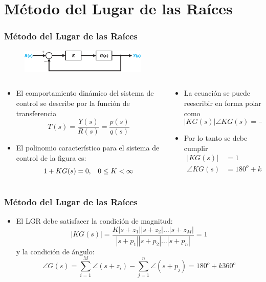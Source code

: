 \documentclass[aspectratio=169,handout]{beamer}
\theoremstyle{definition}
\theoremstyle{plain}
\theoremstyle{remark}
\begin{document}
\section{Método del Lugar de las Raíces}
\begin{frame}[<+->]\frametitle{Método del Lugar de las Raíces}
	\begin{figure}
		\includegraphics[width=6cm]{images/controlsystem.eps}
	\end{figure}
	\vspace*{-3mm}
	\begin{columns}
	\begin{column}{0.5\textwidth}
	\begin{itemize}
		\item El comportamiento dinámico del sistema de control se describe por la función de transferencia
		\begin{equation*}
			T(s) = \frac{Y(s)}{R(s)} = \frac{p(s)}{q(s)}
		\end{equation*}
		\item El polinomio característico para el sistema de control de la figura es:
		\begin{equation*}
			1 + K G(s) = 0,\hspace*{3mm} 0 \leq K < \infty
		\end{equation*}
	\end{itemize}
	\end{column}	
	\begin{column}{0.5\textwidth}
	\begin{itemize}
		\item La ecuación se puede reescribir en forma polar como
		\begin{equation*}
			|KG(s)| \angle KG(s) = -1 + j0
		\end{equation*}
		\item Por lo tanto se debe cumplir
		\begin{align*}
			|KG(s)| &= 1\\
			\angle KG(s) &= 180^o + k360^o
		\end{align*}
	\end{itemize}
	\end{column}	
	\end{columns}
\end{frame}

\begin{frame}[<+->]\frametitle{Método del Lugar de las Raíces}
	\begin{itemize}
		\item El LGR debe satisfacer la condición de magnitud:
		\begin{equation*}
			|KG(s)| = \frac{K|s+z_1||s+z_2|\dots|s+z_M|}{|s+p_1||s+p_2|\dots|s+p_n|} = 1
		\end{equation*}
		y la condición de ángulo:
		\begin{equation*}
			\angle G(s) = \sum_{i=1}^M \angle(s+z_i) - \sum_{j=1}^n \angle(s+p_j) = 180^o + k360^o 
		\end{equation*}
	\end{itemize}
\end{frame}
\end{document}
